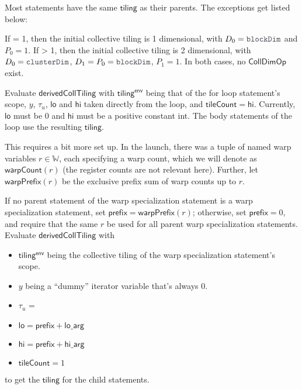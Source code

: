 \filbreak
Most statements have the same $\mathsf{tiling}$ as their parents.
The exceptions get listed below:

\filbreak
{}

If  = 1, then the initial collective tiling is 1 dimensional, with $D_0 = \lighttt{blockDim}$ and $P_0 = 1$.
If  > 1, then the initial collective tiling is 2 dimensional, with $D_0 = \lighttt{clusterDim}$, $D_1 = P_0 = \lighttt{blockDim}$, $P_1 = 1$.
In both cases, no $\mathsf{CollDimOp}$ exist.

\filbreak
{}

Evaluate $\mathsf{derivedCollTiling}$ with $\mathsf{tiling^{env}}$ being that of the for loop statement's scope, $y$, $\tau_u$, $\mathsf{lo}$ and $\mathsf{hi}$ taken directly from the loop, and $\mathsf{tileCount} = \mathsf{hi}$.
Currently, $\mathsf{lo}$ must be 0 and $\mathsf{hi}$ must be a positive constant int.
The body statements of the loop use the resulting $\mathsf{tiling}$.

\filbreak
{}

This requires a bit more set up.
In the  launch, there was a tuple of named warp variables $r \in \mathbb{W}$, each specifying a warp count, which we will denote as $\mathsf{warpCount}(r)$ (the register counts are not relevant here).
Further, let $\mathsf{warpPrefix}(r)$ be the exclusive prefix sum of warp counts up to $r$.

\filbreak
If no parent statement of the warp specialization statement is a warp specialization statement, set $\mathsf{prefix} = \mathsf{warpPrefix}(r)$; otherwise, set $\mathsf{prefix}=0$, and require that the same $r$ be used for all parent warp specialization statements.
Evaluate $\mathsf{derivedCollTiling}$ with
\begin{itemize}
  \item $\mathsf{tiling^{env}}$ being the collective tiling of the warp specialization statement's scope.
  \filbreak
  \item $y$ being a ``dummy'' iterator variable that's always 0.
  \filbreak
  \item $\tau_u$ = 
  \filbreak
  \item $\mathsf{lo} = \mathsf{prefix} + \mathsf{lo\_arg}$
  \filbreak
  \item $\mathsf{hi} = \mathsf{prefix} + \mathsf{hi\_arg}$
  \filbreak
  \item $\mathsf{tileCount} = 1$
\end{itemize}
to get the $\mathsf{tiling}$ for the child statements.

